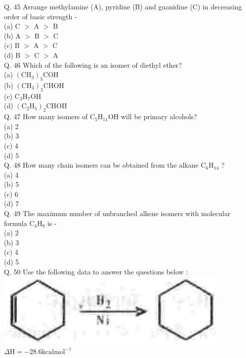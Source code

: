\documentclass[10pt]{article}
\begin{document}
Q. 45 Arrange methylamine (A), pyridine (B) and guanidine (C) in decreasing order of basic strength -\\
(a) C $>$ A $>$ B\\
(b) A $>$ B $>$ C\\
(c) B $>$ A $>$ C\\
(d) B $>$ C $>$ A\\
Q. 46 Which of the following is an isomer of diethyl ether?\\
(a) $\left(\mathrm{CH}_{3}\right)_{3} \mathrm{COH}$\\
(b) $\left(\mathrm{CH}_{3}\right)_{2} \mathrm{CHOH}$\\
(c) $\mathrm{C}_{3} \mathrm{H}_{7} \mathrm{OH}$\\
(d) $\left(\mathrm{C}_{2} \mathrm{H}_{5}\right)_{2} \mathrm{CHOH}$\\
Q. 47 How many isomers of $\mathrm{C}_{5} \mathrm{H}_{11} \mathrm{OH}$ will be primary alcohols?\\
(a) 2\\
(b) 3\\
(c) 4\\
(d) 5\\
Q. 48 How many chain isomers can be obtained from the alkane $\mathrm{C}_{6} \mathrm{H}_{14}$ ?\\
(a) 4\\
(b) 5\\
(c) 6\\
(d) 7\\
Q. 49 The maximum number of unbranched alkene isomers with molecular formula $\mathrm{C}_{4} \mathrm{H}_{8}$ is -\\
(a) 2\\
(b) 3\\
(c) 4\\
(d) 5\\
Q. 50 Use the following data to answer the questions below :\\
\includegraphics[max width=\textwidth, center]{2025_01_28_8470952b98110cec3aabg-136}\\
$\Delta \mathrm{H}=-28.6 \mathrm{kcal} \mathrm{mol}^{-1}$\\
\end{document}
